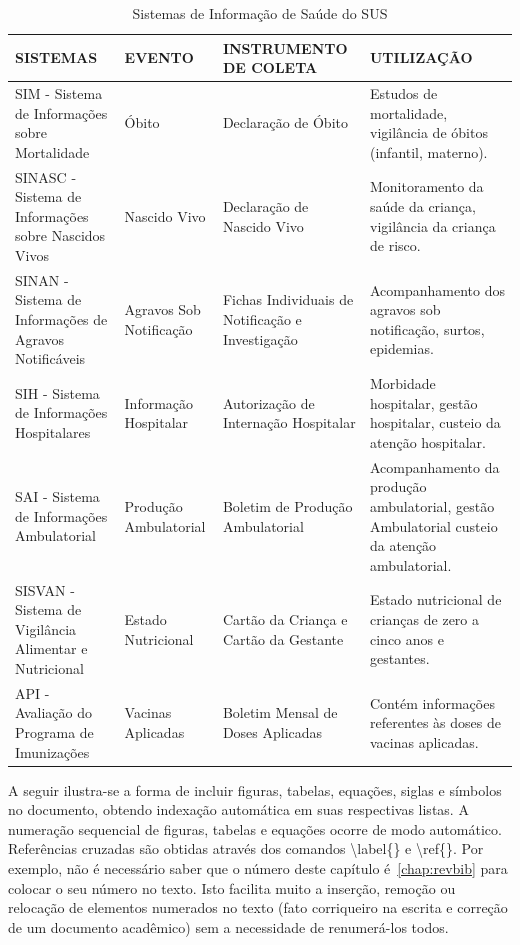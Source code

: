 \begin{table}[htbp]
	\caption{Sistemas de Informação de Saúde do SUS}
	\label{tab:sus}
	\begin{tabular}{|p{4cm}|p{2.5cm}|p{4cm}|p{4cm}|}
		\hline
		SISTEMAS & EVENTO & INSTRUMENTO DE COLETA & UTILIZAÇÃO \\ \hline
		SIM - Sistema de Informações sobre Mortalidade & Óbito & Declaração de Óbito & Estudos de mortalidade, vigilância de óbitos (infantil, materno). \\ \hline
		SINASC - Sistema de Informações sobre Nascidos Vivos & Nascido Vivo & Declaração de Nascido Vivo & Monitoramento da saúde da criança, vigilância da criança de risco. \\ \hline
		SINAN - Sistema de Informações de Agravos Notificáveis & Agravos Sob Notificação & Fichas Individuais de Notificação e Investigação & Acompanhamento dos agravos sob notificação, surtos, epidemias. \\ \hline
		SIH - Sistema de Informações Hospitalares & Informação Hospitalar & Autorização de Internação Hospitalar & Morbidade hospitalar, gestão hospitalar, custeio da atenção hospitalar. \\ \hline
		SAI - Sistema de Informações Ambulatorial & Produção Ambulatorial & Boletim de Produção Ambulatorial & Acompanhamento da produção ambulatorial, gestão Ambulatorial custeio da atenção ambulatorial. \\ \hline
		SISVAN - Sistema de Vigilância Alimentar e Nutricional & Estado Nutricional & Cartão da Criança e Cartão da Gestante & Estado nutricional de crianças de zero a cinco anos e gestantes. \\ \hline
		API - Avaliação do Programa de Imunizações & Vacinas Aplicadas & Boletim Mensal de Doses Aplicadas & Contém informações referentes às doses de vacinas aplicadas. \\ \hline
	\end{tabular}
\end{table}


A seguir ilustra-se a forma de incluir figuras, tabelas, equa\c{c}\~oes, siglas e s\'imbolos no documento, obtendo indexa\c{c}\~ao autom\'atica em suas respectivas listas. A numera\c{c}\~ao sequencial de figuras, tabelas e equa\c{c}\~oes ocorre de modo autom\'atico. Refer\^encias cruzadas s\~ao obtidas atrav\'es dos comandos {\ttfamily \textbackslash label\{\}} e {\ttfamily \textbackslash ref\{\}}. Por exemplo, n\~ao \'e necess\'ario saber que o n\'umero deste cap\'itulo \'e~\ref{chap:revbib} para colocar o seu n\'umero no texto. Isto facilita muito a inser\c{c}\~ao, remo\c{c}\~ao ou reloca\c{c}\~ao de elementos numerados no texto (fato corriqueiro na escrita e corre\c{c}\~ao de um documento acad\^emico) sem a necessidade de renumer\'a-los todos.

